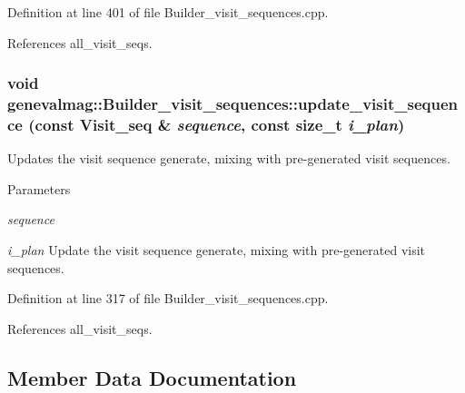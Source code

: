 Definition at line 401 of file Builder\_\-visit\_\-sequences.cpp.



References all\_\-visit\_\-seqs.

\hypertarget{classgenevalmag_1_1Builder__visit__sequences_aeb3f3076ab75a8869785d98c0c3bcdf2}{
\subsubsection[{update\_\-visit\_\-sequence}]{\setlength{\rightskip}{0pt plus 5cm}void genevalmag::Builder\_\-visit\_\-sequences::update\_\-visit\_\-sequence (const {\bf Visit\_\-seq} \& {\em sequence}, \/  const size\_\-t {\em i\_\-plan})}}
\label{classgenevalmag_1_1Builder__visit__sequences_aeb3f3076ab75a8869785d98c0c3bcdf2}
Updates the visit sequence generate, mixing with pre-\/generated visit sequences. 
\begin{DoxyParams}{Parameters}
\item[{\em sequence}]\item[{\em i\_\-plan}]Update the visit sequence generate, mixing with pre-\/generated visit sequences. \end{DoxyParams}


Definition at line 317 of file Builder\_\-visit\_\-sequences.cpp.



References all\_\-visit\_\-seqs.



\subsection{Member Data Documentation}
\hypertarget{classgenevalmag_1_1Builder__visit__sequences_aba229b62df85d994ce9a5da960c1273a}{
\subsubsection[{all\_\-visit\_\-seqs}]{}}
\label{classgenevalmag_1_1Builder__visit__sequences_aba229b62df85d994ce9a5da960c1273a}


